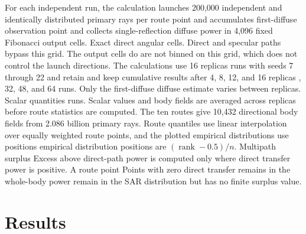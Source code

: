\documentclass{IEEEoj} %
\providecommand{\DIFadd}[1]{{\protect\color{blue} \sf #1}} %
\providecommand{\DIFdel}[1]{{\protect\color{red} \scriptsize #1}} %
\providecommand{\DIFaddbegin}{} %
\providecommand{\DIFaddend}{} %
\providecommand{\DIFdelbegin}{} %
\providecommand{\DIFdelend}{} %
\begin{document}
\DIFadd{For each independent run, the calculation }\DIFaddend launches 200,000 \DIFdelbegin \DIFdel{independent and identically distributed }\DIFdelend primary rays per
\DIFdelbegin \DIFdel{route point and accumulates first-diffuse }\DIFdelend \DIFaddbegin \DIFadd{observation point and collects single-reflection diffuse }\DIFaddend power in 4,096 fixed
\DIFdelbegin \DIFdel{Fibonacci output cells. Exact direct }\DIFdelend \DIFaddbegin \DIFadd{angular cells. Direct }\DIFaddend and specular paths \DIFdelbegin \DIFdel{bypass this grid. The output cells do }\DIFdelend \DIFaddbegin \DIFadd{are not binned on this grid, which does
}\DIFaddend not control the launch directions. The calculations use \DIFdelbegin \DIFdel{16 replicas }\DIFdelend \DIFaddbegin \DIFadd{64 runs }\DIFaddend with seeds 7
through \DIFdelbegin \DIFdel{22 and retain }\DIFdelend \DIFaddbegin \DIFadd{70 and keep }\DIFaddend cumulative results after 4, 8, 12, \DIFdelbegin \DIFdel{and }\DIFdelend 16\DIFdelbegin \DIFdel{replicas}\DIFdelend \DIFaddbegin \DIFadd{, 32, 48, and 64 runs}\DIFaddend .
Only the \DIFdelbegin \DIFdel{first-diffuse }\DIFdelend \DIFaddbegin \DIFadd{diffuse }\DIFaddend estimate varies between \DIFdelbegin \DIFdel{replicas. Scalar quantities }\DIFdelend \DIFaddbegin \DIFadd{runs. Scalar values }\DIFaddend and body fields
are averaged \DIFdelbegin \DIFdel{across replicas
}\DIFdelend before route statistics are computed. \DIFaddbegin \DIFadd{The ten routes give 10,432
directional body fields from 2.086 billion primary rays. }\DIFaddend Route quantiles use
linear interpolation over equally weighted \DIFdelbegin \DIFdel{route }\DIFdelend points, and \DIFdelbegin \DIFdel{the plotted empirical distributions use
positions }\DIFdelend \DIFaddbegin \DIFadd{empirical distribution
positions are }\DIFaddend $(\operatorname{rank}-0.5)/n$. \DIFdelbegin \DIFdel{Multipath surplus }\DIFdelend \DIFaddbegin \DIFadd{Excess above direct-path power }\DIFaddend is
computed only where direct \DIFdelbegin \DIFdel{transfer }\DIFdelend \DIFaddbegin \DIFadd{power }\DIFaddend is positive. \DIFdelbegin \DIFdel{A route point }\DIFdelend \DIFaddbegin \DIFadd{Points }\DIFaddend with zero direct \DIFdelbegin \DIFdel{transfer
remains in the whole-body }\DIFdelend \DIFaddbegin \DIFadd{power
remain in the }\DIFaddend SAR distribution but \DIFdelbegin \DIFdel{has no finite surplus value. }%

\section{\DIFdel{Results}}
\addtocounter{section}{-1}%
\end{document}
